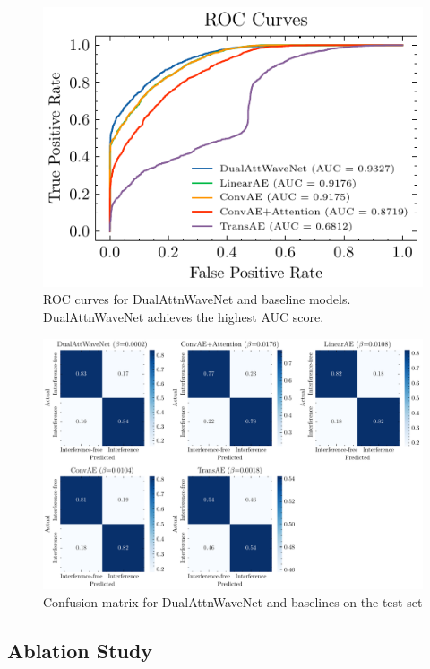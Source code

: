\documentclass[12pt]{article}
\begin{document}
\begin{figure}[htbp]
    \centering
    \includegraphics[width=0.5\linewidth]{roc-comparison.pdf}
    \caption{ROC curves for DualAttnWaveNet and baseline models. DualAttnWaveNet achieves the highest AUC score.}
    \label{fig:roc_comparison}
\end{figure}

\begin{figure}[htbp]
    \centering
    \includegraphics[width=0.9\linewidth]{confusion.pdf}
    \caption{Confusion matrix for DualAttnWaveNet and baselines on the test set}
    \label{fig:confusion_matrix}
\end{figure}

\subsection{Ablation Study}
\end{document}

